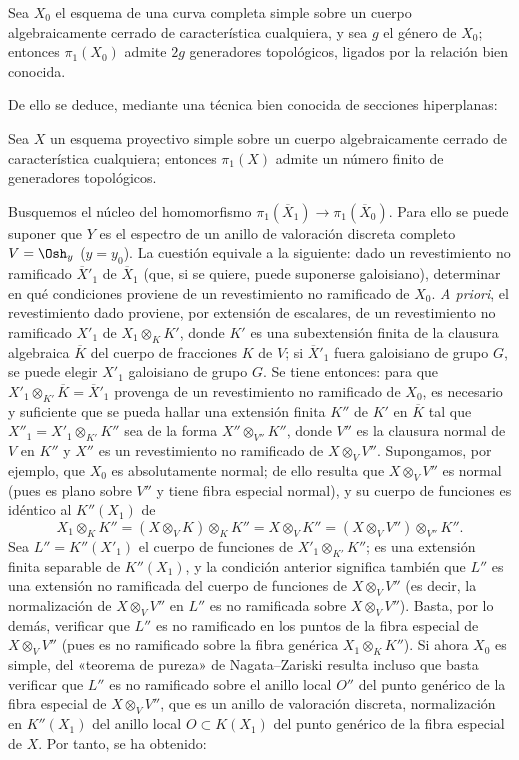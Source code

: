  Sea $X_0$ el esquema de una curva completa simple sobre
un cuerpo algebraicamente cerrado de característica cualquiera, y sea $g$ el
género de $X_0$; entonces $\pi_1(X_0)$ admite $2g$ generadores topológicos,
ligados por la relación bien conocida.

De ello se deduce, mediante una técnica bien conocida de secciones
hiperplanas:

 Sea $X$ un esquema proyectivo simple sobre un cuerpo
algebraicamente cerrado de característica cualquiera; entonces $\pi_1(X)$
admite un número finito de generadores topológicos.

Busquemos el núcleo del homomorfismo
$\pi_1(\overline X_1)\longrightarrow\pi_1(\overline X_0)$. Para ello se puede
suponer que $Y$ es el espectro de un anillo de valoración discreta completo
$V=\Osh_y$ ($y=y_0$). La cuestión equivale a la siguiente: dado un revestimiento
no ramificado $\overline X'_1$ de $\overline X_1$ (que, si se quiere, puede
suponerse galoisiano), determinar en qué condiciones proviene de un
revestimiento no ramificado de $X_0$. \textit{A priori}, el revestimiento dado
proviene, por extensión de escalares, de un revestimiento no ramificado $X'_1$
de $X_1\otimes_K K'$, donde $K'$ es una subextensión finita de la clausura
algebraica $\overline K$ del cuerpo de fracciones $K$ de $V$; si
$\overline X'_1$ fuera galoisiano de grupo $G$, se puede elegir $X'_1$
galoisiano de grupo $G$. Se tiene entonces: para que
$X'_1\otimes_{K'}\overline K=\overline X'_1$ provenga de un revestimiento no
ramificado de $X_0$, es necesario y suficiente que se pueda hallar una extensión
finita $K''$ de $K'$ en $\overline K$ tal que
$X''_1=X'_1\otimes_{K'}K''$ sea de la forma $X''\otimes_{V''}K''$, donde $V''$
es la clausura normal de $V$ en $K''$ y $X''$ es un revestimiento no ramificado
de $X\otimes_VV''$. Supongamos, por ejemplo, que $X_0$ es absolutamente normal;
de ello resulta que $X\otimes_VV''$ es normal (pues es plano sobre $V''$ y tiene
fibra especial normal), y su cuerpo de funciones es idéntico al $K''(X_1)$ de
\[
  X_1\otimes_KK''
  =(X\otimes_VK)\otimes_KK''
  =X\otimes_VK''
  =(X\otimes_VV'')\otimes_{V''}K''.
\]
Sea $L''=K''(X'_1)$ el cuerpo de funciones de $X'_1\otimes_{K'}K''$; es una
extensión finita separable de $K''(X_1)$, y la condición anterior significa
también que $L''$ es una extensión no ramificada del cuerpo de funciones de
$X\otimes_VV''$ (es decir, la normalización de $X\otimes_VV''$ en $L''$ es no
ramificada sobre $X\otimes_VV''$). Basta, por lo demás, verificar que $L''$ es
no ramificado en los puntos de la fibra especial de $X\otimes_VV''$ (pues es no
ramificado sobre la fibra genérica $X_1\otimes_KK''$). Si ahora $X_0$ es simple,
del «teorema de pureza» de Nagata--Zariski resulta incluso que basta verificar
que $L''$ es no ramificado sobre el anillo local $O''$ del punto genérico de la
fibra especial de $X\otimes_VV''$, que es un anillo de valoración discreta,
normalización en $K''(X_1)$ del anillo local $O\subset K(X_1)$ del punto
genérico de la fibra especial de $X$. Por tanto, se ha obtenido:

